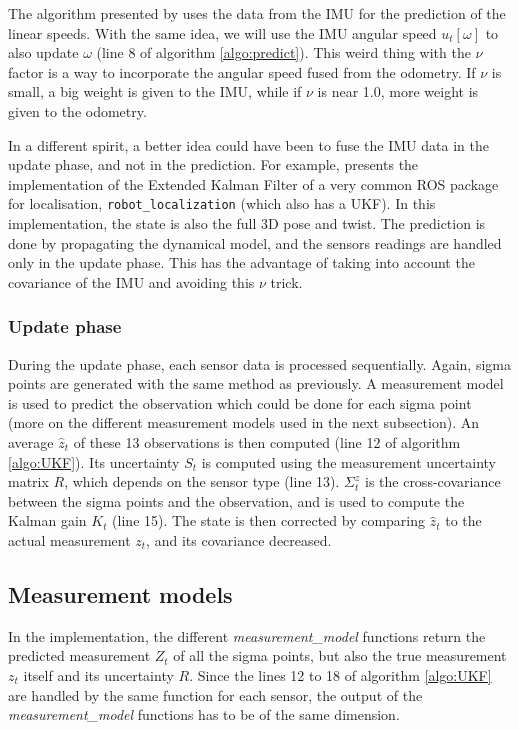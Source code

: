 \documentclass[10pt,a4paper, twocolumn]{article}
\begin{document}
The algorithm presented by \cite{RobustVehicleLocalization} uses the data from the IMU for the prediction of the linear speeds. With the same idea, we will use the IMU angular speed $u_t[\omega]$ to also update $\omega$ (line 8 of algorithm \ref{algo:predict}). This weird thing with the $\nu$ factor is a way to incorporate the angular speed fused from the odometry. If $\nu$ is small, a big weight is given to the IMU, while if $\nu$ is near 1.0, more weight is given to the odometry.

In a different spirit, a better idea could have been to fuse the IMU data in the update phase, and not in the prediction. For example, \cite{GeneralizedEKFImplementation} presents the implementation of the Extended Kalman Filter of a very common ROS package for localisation, \texttt{robot\_localization} (which also has a UKF). In this implementation, the state is also the full 3D pose and twist. The prediction is done by propagating the dynamical model, and the sensors readings are handled only in the update phase. This has the advantage of taking into account the covariance of the IMU and avoiding this $\nu$ trick.

\subsubsection{Update phase}
During the update phase, each sensor data is processed sequentially. Again, sigma points are generated with the same method as previously. A measurement model is used to predict the observation which could be done for each sigma point (more on the different measurement models used in the next subsection). An average $\hat z_t$ of these 13 observations is then computed (line 12 of algorithm \ref{algo:UKF}). Its uncertainty $S_t$ is computed using the measurement uncertainty matrix $R$, which depends on the sensor type (line 13). $\Sigma_t^z$ is the cross-covariance between the sigma points and the observation, and is used to compute the Kalman gain $K_t$ (line 15). The state is then corrected by comparing $\hat z_t$ to the actual measurement $z_t$, and its covariance decreased.


\subsection{Measurement models}
In the implementation, the different \textit{measurement\_model} functions return the predicted measurement $Z_t$ of all the sigma points, but also the true measurement $z_t$ itself and its uncertainty $R$. Since the lines 12 to 18 of algorithm \ref{algo:UKF} are handled by the same function for each sensor, the output of the \textit{measurement\_model} functions has to be of the same dimension.
\end{document}
